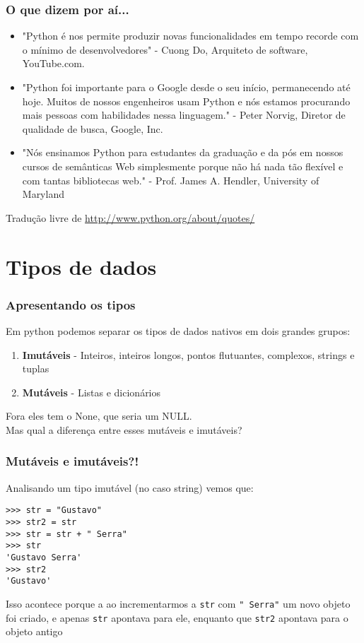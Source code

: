\documentclass{beamer}
\begin{document}
\begin{frame}
\frametitle{O que dizem por aí...}
  \begin{itemize}
    \item "Python é nos permite produzir novas funcionalidades em tempo recorde com o mínimo de desenvolvedores" - Cuong Do, Arquiteto de software, YouTube.com.
    \item "Python foi importante para o Google desde o seu início, permanecendo até hoje. Muitos de nossos engenheiros usam Python e nós estamos procurando mais pessoas com habilidades nessa linguagem." - Peter Norvig, Diretor de qualidade de busca, Google, Inc.
    \item "Nós ensinamos Python para estudantes da graduação e da pós em nossos cursos de semânticas Web simplesmente porque não há nada tão flexível e com tantas bibliotecas web." - Prof. James A. Hendler, University of Maryland
  \end{itemize}
  \begin{footnotesize}
    Tradução livre de \url{http://www.python.org/about/quotes/}
  \end{footnotesize}
\end{frame}

\section{Tipos de dados}
\begin{frame}
\frametitle{Apresentando os tipos}
Em python podemos separar os tipos de dados nativos em dois grandes grupos:
\pause
\begin{enumerate}
 \item \textbf{Imutáveis} - Inteiros, inteiros longos, pontos flutuantes, complexos, strings e tuplas
\pause
 \item \textbf{Mutáveis} - Listas e dicionários
\end{enumerate}
\pause
Fora eles tem o None, que seria um NULL. \\
\pause
Mas qual a diferença entre esses mutáveis e imutáveis?
\end{frame}

\begin{frame}[containsverbatim]
\frametitle{Mutáveis e imutáveis?!}
Analisando um tipo imutável (no caso string) vemos que:
 \begin{lstlisting}
>>> str = "Gustavo"
>>> str2 = str
>>> str = str + " Serra"
>>> str
'Gustavo Serra'
>>> str2
'Gustavo'
 \end{lstlisting}
Isso acontece porque a ao incrementarmos a \texttt{str} com \texttt{" Serra"} um novo objeto foi criado, e apenas \texttt{str} apontava para ele, enquanto que \texttt{str2} apontava para o objeto antigo
\end{frame}
\end{document}
